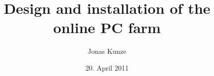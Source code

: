
\usepackage[ngerman]{babel}
\usepackage{bibgerm}

\title{Design and installation of the online PC farm}
\author{Jonas Kunze}
\date{20. April 2011}


\subject{Exp. Bestimmung der elektronischen Zustandsdichte von Spintronik Materialien}

 
 	
